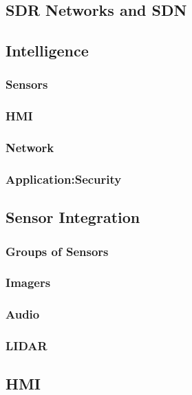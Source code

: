 \subsection{SDR Networks and SDN}

\subsection{Intelligence}

\subsubsection{Sensors}

\subsubsection{HMI}

\subsubsection{Network}

\subsubsection{Application:Security}

\subsection{Sensor Integration}

\subsubsection{Groups of Sensors}

\subsubsection{Imagers}

\subsubsection{Audio}

\subsubsection{LIDAR}

\subsection{HMI}

